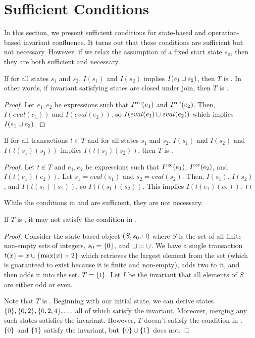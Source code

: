 \section{Sufficient Conditions}
In this section, we present sufficient conditions for state-based and
operation-based invariant confluence. It turns out that these conditions are
sufficient but not necessary. However, if we relax the assumption of a fixed
start state $s_0$, then they are both sufficient and necessary.

\begin{claim}
  If for all states $s_1$ and $s_2$, $I(s_1)$ and $I(s_2)$ implies $I(s_1 \sqcup
  s_2)$, then $T$ is \Iconfluent{}. In other words, if invariant satisfying
  states are closed under join, then $T$ is \Iconfluent.
\end{claim}
\begin{proof}
  Let $e_1, e_2$ be expressions such that $I^{\text{rec}}(e_1)$ and $I^{\text{rec}}(e_2)$. Then,
  $I(eval(e_1))$ and $I(eval(e_2))$, so $I(eval(e_1) \sqcup eval(e_2))$ which
  implies $I(e_1 \sqcup e_2)$.
\end{proof}

\begin{claim}
  If for all transactions $t \in T$ and for all states $s_1$ and $s_2$,
  $I(s_1)$ and $I(s_2)$ and $I(t(s_1)(s_1))$ implies $I(t(s_1)(s_2))$, then $T$
  is \Iconfluent{}.
\end{claim}
\begin{proof}
  Let $t \in T$ and $e_1, e_2$ be expressions such that $I^{\text{rec}}(e_1)$,
  $I^{\text{rec}}(e_2)$, and $I(t(e_1)(e_2))$. Let $s_1 = eval(e_1)$ and $s_2 =
  eval(s_2)$. Then, $I(s_1)$, $I(s_2)$, and $I(t(s_1)(s_1))$, so
  $I(t(s_1)(s_2))$. This implies $I(t(e_1)(e_2))$.
\end{proof}

While the conditions in  and
 are sufficient, they are not necessary.

\begin{claim}
  If $T$ is \Iconfluent, it may not satisfy the condition in
  .
\end{claim}
\begin{proof}
  Consider the state based object $(S, s_0, \sqcup)$ where $S$ is the set of all
  finite non-empty sets of integers, $s_0 = \{0\}$, and $\sqcup = \cup$. We
  have a single transaction $t(x) = x \cup \{\max(x) + 2\}$ which retrieves
  the largest element from the set (which is guaranteed to exist because it is
  finite and non-empty), adds two to it, and then adds it into the set. $T =
  \{t\}$. Let $I$ be the invariant that all elements of $S$ are either odd or
  even.

  Note that $T$ is \Iconfluent{}. Beginning with our initial state, we can
  derive states $\{0\}, \{0, 2\}, \{0, 2, 4\}, \ldots$ all of which
  satisfy the invariant. Moreover, merging any such states satisfies the
  invariant.
  However, $T$ doesn't satisfy the condition in .
  $\{0\}$ and $\{1\}$ satisfy the invariant, but $\{0\} \cup \{1\}$
  does not.
\end{proof}

